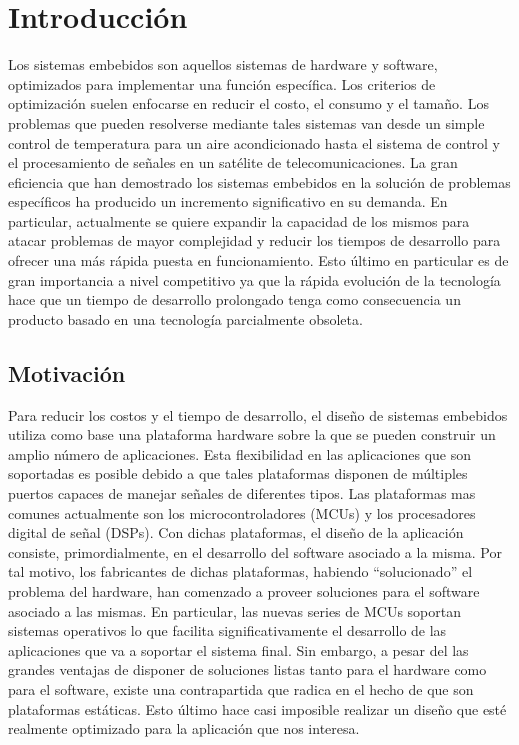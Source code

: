 \chapter{Introducción}

Los sistemas embebidos son aquellos sistemas de hardware y software, optimizados para
implementar una función específica. Los criterios de optimización
suelen enfocarse en reducir el costo, el consumo y el tamaño. Los
problemas que pueden resolverse mediante tales sistemas van desde un
simple control de temperatura para un aire acondicionado hasta el
sistema de control y el procesamiento de señales en un satélite de
telecomunicaciones. La gran eficiencia que han demostrado los sistemas
embebidos en la solución de problemas específicos ha producido un
incremento significativo en su demanda. En particular, actualmente se
quiere expandir la capacidad de los mismos para atacar problemas de
mayor complejidad y reducir los tiempos de desarrollo para ofrecer una
más rápida puesta en funcionamiento. Esto último en particular es de
gran importancia a nivel competitivo ya que la rápida evolución de la
tecnología hace que un tiempo de desarrollo prolongado tenga como
consecuencia un producto basado en una tecnología parcialmente
obsoleta.

\section{Motivación}

Para reducir los costos y el tiempo de desarrollo, el diseño de
sistemas embebidos utiliza como base una plataforma hardware sobre la
que se pueden construir un amplio número de aplicaciones. Esta
flexibilidad en las aplicaciones que son soportadas es posible debido
a que tales plataformas disponen de múltiples puertos capaces de
manejar señales de diferentes tipos. Las plataformas mas comunes
actualmente son los microcontroladores (MCUs) y los procesadores
digital de señal (DSPs). Con dichas plataformas, el diseño de la
aplicación consiste, primordialmente, en el desarrollo del software
asociado a la misma. Por tal motivo, los fabricantes de dichas
plataformas, habiendo ``solucionado'' el problema del hardware, han
comenzado a proveer soluciones para el software asociado a las
mismas. En particular, las nuevas series de MCUs soportan sistemas
operativos lo que facilita significativamente el desarrollo de las
aplicaciones que va a soportar el sistema final. Sin embargo, a pesar
del las grandes ventajas de disponer de soluciones listas tanto para
el hardware como para el software, existe una contrapartida que radica
en el hecho de que son plataformas estáticas. Esto último hace casi
imposible realizar un diseño que esté realmente optimizado para la
aplicación que nos interesa.

